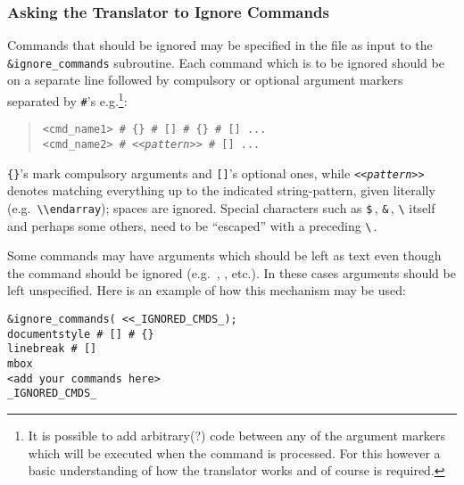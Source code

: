 \subsubsection{Asking the Translator to Ignore Commands\label{ignore}}
\html{\\}%
Commands that should be ignored may be specified in the 
file as input to the \verb|&ignore_commands| subroutine. 
Each command which is to be ignored should be on a separate line 
followed by compulsory or optional argument markers separated by 
{\verb|#|}'s e.g.\footnote{It is possible to add arbitrary(?) \Perl{} code
between any of the argument markers which will be executed when 
the command is processed. For this however a basic understanding of
how the translator works and of course \Perl{} is required.}:
\begin{quote}
\begin{small}
\verb|<cmd_name1> # {} # [] # {} # [] ...|\\
\verb|<cmd_name2> # |\texttt{<<\emph{pattern}>>}\verb| # [] ...|
\end{small}
\end{quote}
\verb|{}|'s mark compulsory arguments and \verb|[]|'s optional ones,
while \texttt{<<\emph{pattern}>>} denotes matching everything up to the
indicated string-pattern, given literally (e.g.\ \verb|\\endarray|);
spaces are ignored. Special characters
such as \verb|$|\,, \verb|&|\,, \verb|\| itself and perhaps some others,
need to be ``escaped'' with a preceding \verb|\|\,.


\html{\\}%

Some commands may have arguments which should be left as text even
though the command should be ignored 
(e.g.\ , , etc.). 
In these cases arguments should be left unspecified.
Here is an example of how this mechanism may be used:
\begin{small}
\begin{verbatim}
&ignore_commands( <<_IGNORED_CMDS_);
documentstyle # [] # {}
linebreak # []
mbox
<add your commands here>
_IGNORED_CMDS_
\end{verbatim}
\end{small}


